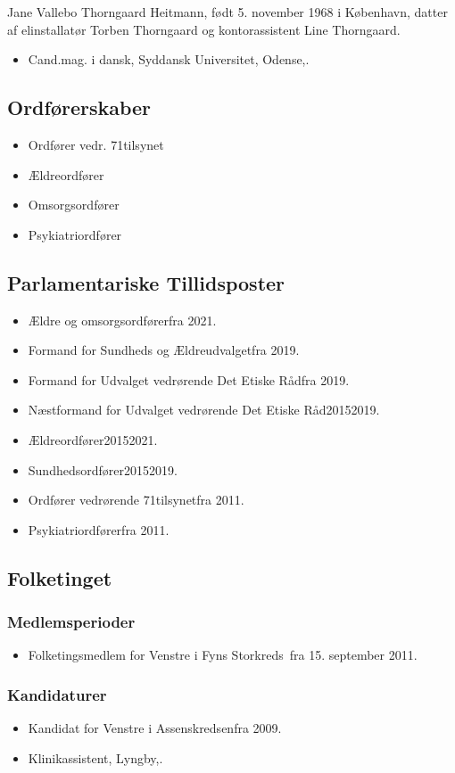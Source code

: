 \documentclass[11pt, a4paper]{awesome-cv}
\begin{document}
\makecvheader[R]
\makelettertitle
\begin{cvletter}
Jane Vallebo Thorngaard Heitmann, født 5. november 1968 i København, datter af elinstallatør Torben Thorngaard og kontorassistent Line Thorngaard.

\begin{itemize}
\item Cand.mag. i dansk, Syddansk Universitet, Odense,.
\end{itemize}
\subsection*{Ordførerskaber}
\begin{itemize}
\item Ordfører vedr.  71tilsynet 
\item Ældreordfører
\item Omsorgsordfører
\item Psykiatriordfører
\end{itemize}
\subsection*{Parlamentariske Tillidsposter}
\begin{itemize}
\item Ældre og omsorgsordførerfra 2021.
\item Formand for Sundheds og Ældreudvalgetfra 2019.
\item Formand for Udvalget vedrørende Det Etiske Rådfra 2019.
\item Næstformand for Udvalget vedrørende Det Etiske Råd20152019.
\item Ældreordfører20152021.
\item Sundhedsordfører20152019.
\item Ordfører vedrørende 71tilsynetfra 2011.
\item Psykiatriordførerfra 2011.
\end{itemize}
\subsection*{Folketinget}
\subsubsection*{Medlemsperioder}
\begin{itemize}
\item Folketingsmedlem for Venstre i Fyns Storkreds fra 15. september 2011.
\end{itemize}
\subsubsection*{Kandidaturer}
\begin{itemize}
\item Kandidat for Venstre i Assenskredsenfra 2009.
\end{itemize}
\begin{itemize}
\item Klinikassistent, Lyngby,.
\end{itemize}
\end{cvletter}
\end{document}
